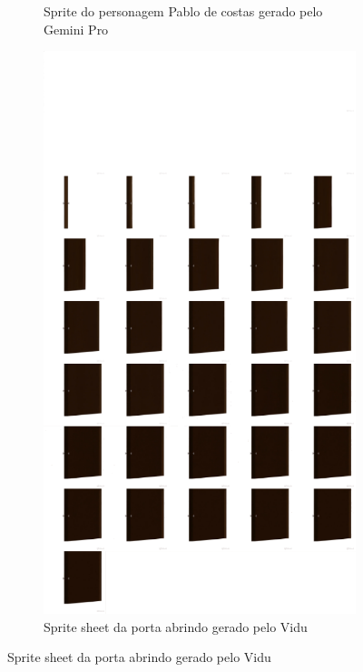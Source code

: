 \begin{figure}[htbp]
\begin{subfigure}{0.25\linewidth}
        \caption{\small Sprite do personagem Pablo de costas gerado pelo Gemini Pro}
        \label{fig:pixelLabPabloGeminiProCostas}
    \end{subfigure}\hfill
    \begin{subfigure}{0.45\linewidth}
        \centering
        \includegraphics[width=1\linewidth]{figs/vidu/Pixilart/porta_sprite_sheet_pixel.png}
        \caption{\small Sprite sheet da porta abrindo gerado pelo Vidu}
        \label{fig:pixelLabPortaViduSideView}
    \end{subfigure}


\end{figure}
